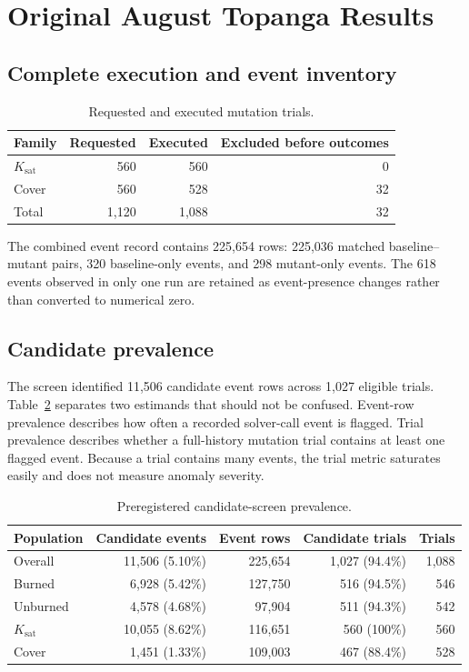 \documentclass[11pt]{article}
\newcommand{\Ksat}{\ensuremath{K_{\mathrm{sat}}}}
\begin{document}
\section{Original August Topanga Results}

\subsection{Complete execution and event inventory}

\begin{table}[H]
  \centering
  \caption{Requested and executed mutation trials.}
  \label{tab:execution}
  \begin{tabular}{lrrr}
    \toprule
    Family & Requested & Executed & Excluded before outcomes \\
    \midrule
    \Ksat{} & 560 & 560 & 0 \\
    Cover & 560 & 528 & 32 \\
    \midrule
    Total & 1,120 & 1,088 & 32 \\
    \bottomrule
  \end{tabular}
\end{table}

The combined event record contains 225,654 rows: 225,036 matched baseline--mutant
pairs, 320 baseline-only events, and 298 mutant-only events. The 618 events
observed in only one run are retained as event-presence changes rather than
converted to numerical zero.

\subsection{Candidate prevalence}

The screen identified 11,506 candidate event rows across 1,027 eligible
trials. Table~\ref{tab:prevalence} separates two estimands that should not be
confused. Event-row prevalence describes how often a recorded solver-call event
is flagged. Trial prevalence describes whether a full-history mutation trial
contains at least one flagged event. Because a trial contains many events, the
trial metric saturates easily and does not measure anomaly severity.

\begin{table}[H]
  \centering
  \caption{Preregistered candidate-screen prevalence.}
  \label{tab:prevalence}
  \begin{tabular}{lrrrr}
    \toprule
    Population & Candidate events & Event rows & Candidate trials & Trials \\
    \midrule
    Overall & 11,506 (5.10\%) & 225,654 & 1,027 (94.4\%) & 1,088 \\
    Burned & 6,928 (5.42\%) & 127,750 & 516 (94.5\%) & 546 \\
    Unburned & 4,578 (4.68\%) & 97,904 & 511 (94.3\%) & 542 \\
    \Ksat{} & 10,055 (8.62\%) & 116,651 & 560 (100\%) & 560 \\
    Cover & 1,451 (1.33\%) & 109,003 & 467 (88.4\%) & 528 \\
    \bottomrule
  \end{tabular}
\end{table}
\end{document}
